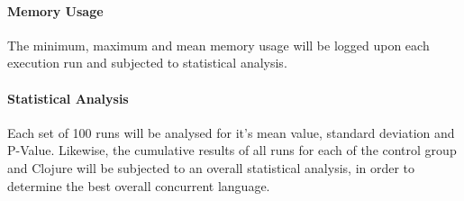 \documentclass[12pt,a4paper]{article}
\begin{document}
\paragraph{Memory Usage}
The minimum, maximum and mean memory usage will be logged upon each execution run and subjected to statistical analysis.

\paragraph{Statistical Analysis}
Each set of 100 runs will be analysed for it's mean value, standard deviation and P-Value. Likewise, the cumulative results of all runs for each of the control group and Clojure will be subjected to an overall statistical analysis, in order to determine the best overall concurrent language.  

\newpage
\singlespacing
{}


\end{document}

